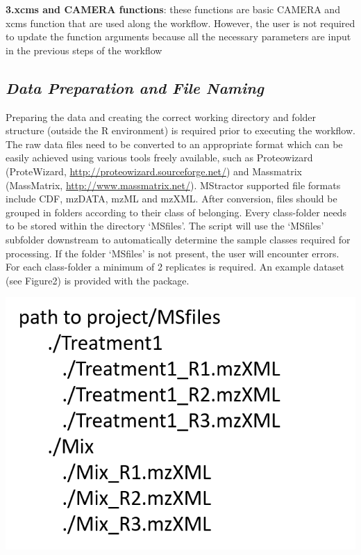 \documentclass[
]{article}
\begin{document}
\textbf{3.xcms and CAMERA functions}: these functions are basic CAMERA
and xcms function that are used along the workflow. However, the user is
not required to update the function arguments because all the necessary
parameters are input in the previous steps of the workflow

\hypertarget{data-preparation-and-file-naming}{%
\subsection{\texorpdfstring{\emph{Data Preparation and File
Naming}}{Data Preparation and File Naming}}\label{data-preparation-and-file-naming}}

Preparing the data and creating the correct working directory and folder
structure (outside the R environment) is required prior to executing the
workflow. The raw data files need to be converted to an appropriate
format which can be easily achieved using various tools freely
available, such as Proteowizard (ProteWizard,
\url{http://proteowizard.sourceforge.net/}) and Massmatrix (MassMatrix,
\url{http://www.massmatrix.net/}). MStractor supported file formats
include CDF, mzDATA, mzML and mzXML. After conversion, files should be
grouped in folders according to their class of belonging. Every
class-folder needs to be stored within the directory `MSfiles'. The
script will use the `MSfiles' subfolder downstream to automatically
determine the sample classes required for processing. If the folder
`MSfiles' is not present, the user will encounter errors. For each
class-folder a minimum of 2 replicates is required. An example dataset
(see Figure2) is provided with the package.

\includegraphics{./subdirchart.png}
\end{document}
